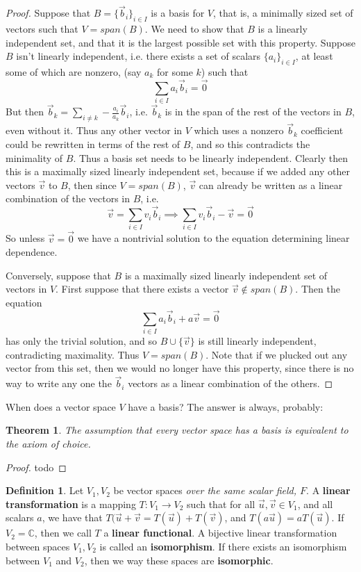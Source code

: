 \documentclass{article}
\theoremstyle{definition}
\newtheorem{definition}{Definition}[section]
\theoremstyle{plain}
\theoremstyle{theorem}
\newtheorem{theorem}{Theorem}[section]
\begin{document}
	\begin{proof}
		Suppose that $B = \{\vec{b}_i\}_{i \in I}$ is a basis for $V$, that is, a minimally sized set of vectors such that $V = span(B)$. We need to show that $B$ is a linearly independent set, and that it is the largest possible set with this property. Suppose $B$ isn't linearly independent, i.e. there exists a set of  scalars $\{a_i\}_{i\in I}$, at least some of which are nonzero, (say $a_k$ for some $k$) such that 
		\[ \sum_{i \in I} a_i \vec{b}_i = \vec{0} \]
	But then $\vec{b}_k = \sum_{i \neq k} -\frac{a_i}{a_k} \vec{b}_i$, i.e. $\vec{b}_k$ is in the span of the rest of the vectors in $B$, even without it. Thus any other vector in $V$ which uses a nonzero $\vec{b}_k$ coefficient could be rewritten in terms of the rest of $B$, and so this contradicts the minimality of $B$. Thus a basis set needs to be linearly independent. Clearly then this is a maximally sized linearly independent set, because if we added any other vectors $\vec{v}$ to $B$, then since $V = span(B)$, $\vec{v}$ can already be written as a linear combination of the vectors in $B$, i.e. 
	\[ \vec{v} = \sum_{i \in I} v_i \vec{b}_i \implies \sum_{i \in I} v_i \vec{b}_i - \vec{v} = \vec{0} \]
	So unless $\vec{v} = \vec{0}$ we have a nontrivial solution to the equation determining linear dependence. 
	\par Conversely, suppose that $B$ is a maximally sized linearly independent set of vectors in $V$. First suppose that there exists a vector $\vec{v} \notin span(B)$. Then the equation
	\[ \sum_{i \in I} a_i \vec{b}_i + a\vec{v} = \vec{0} \] 
	has only the trivial solution, and so $B \cup \{\vec{v}\}$ is still linearly independent, contradicting maximality. Thus $V = span(B)$. Note that if we plucked out any vector from this set, then we would no longer have this property, since there is no way to write any one the $\vec{b}_i$ vectors as a linear combination of the others. 
\end{proof}
When does a vector space $V$ have a basis? The answer is always, probably:
\begin{theorem}
	The assumption that every vector space has a basis is equivalent to the axiom of choice.
\end{theorem}
\begin{proof}
	todo
\end{proof}
\begin{definition}
	Let $V_1,V_2$ be vector spaces \textit{over the same scalar field, $F$}. A \textbf{linear transformation} is a mapping  $T:V_1 \to V_2$ such that for all $\vec{u},\vec{v} \in V_1$, and all scalars $a$, we have that $T(\vec{u}+\vec{v} = T(\vec{u})+T(\vec{v})$, and $T(a\vec{u}) = aT(\vec{u})$. If $V_2 = \mathbb{C}$, then we call $T$ a \textbf{linear functional}. A bijective linear transformation between spaces $V_1,V_2$ is called an \textbf{isomorphism}. If there exists an isomorphism between $V_1$ and $V_2$, then we way these spaces are \textbf{isomorphic}.
\end{definition}
\end{document}
